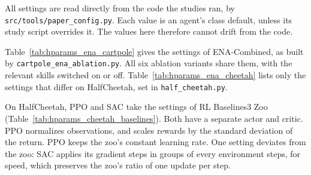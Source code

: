 All settings are read directly from the code the studies ran, by \texttt{src/tools/paper\_config.py}. Each value is an agent's class default, unless its study script overrides it. The values here therefore cannot drift from the code.

Table~\ref{tab:hparams_ena_cartpole} gives the settings of ENA-Combined, as built by \texttt{cartpole\_ena\_ablation.py}. All six ablation variants share them, with the relevant skills switched on or off. Table~\ref{tab:hparams_ena_cheetah} lists only the settings that differ on HalfCheetah, set in \texttt{half\_cheetah.py}.

On HalfCheetah, PPO and SAC take the settings of RL Baselines3 Zoo~\cite{raffin2020rlzoo} (Table~\ref{tab:hparams_cheetah_baselines}). Both have a separate actor and critic. PPO normalizes observations, and scales rewards by the standard deviation of the return. PPO keeps the zoo's constant learning rate. One setting deviates from the zoo: SAC applies its gradient steps in groups of  every  environment steps, for speed, which preserves the zoo's ratio of one update per step.

